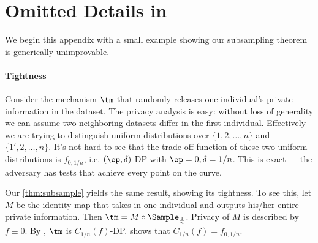 \section{Omitted Details in }
\label{app:property}
We begin this appendix with a small example showing our subsampling theorem is generically unimprovable.
\paragraph{Tightness} %
\label{par:example_and_tightness}


Consider the mechanism $\tm$ that randomly releases one individual's private information in the dataset. The privacy analysis is easy: without loss of generality we can assume two neighboring datasets differ in the first individual.  Effectively we are trying to distinguish uniform distributions over $\{1,2,\ldots, n\}$ and $\{1',2,\ldots, n\}$. It's not hard to see that the trade-off function of these two uniform distributions is $f_{0,1/n}$, i.e. $(\ep,\delta)$-DP with $\ep=0, \delta=1/n$. This is exact --- the adversary has tests that achieve every point on the curve.

Our \cref{thm:subsample} yields the same result, showing its tightness. To see this, let $M$ be the identity map that takes in one individual and outputs his/her entire private information. Then $\tm = M\circ\Sample_{\frac{1}{n}}$. Privacy of $M$ is described by $f\equiv 0$. By , $\tm$ is $C_{1/n}(f)$-DP.  shows that $C_{1/n}(f)=f_{0,1/n}$.



